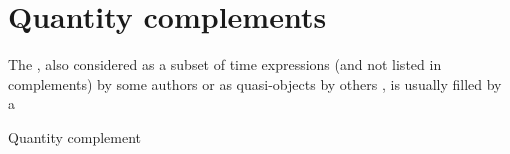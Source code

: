 \documentclass[../main.tex]{subfiles}
\begin{document}
\section{Quantity complements}\label{sec:quantity-complement}

The , also considered as a subset of time expressions (and not listed in complements)
by some authors \citep[Sections 7.2-7.4]{po2015chinese} or as quasi-objects by others \citep[]{xianhan2004}, is usually filled by a %

Quantity complement 


\cite{huang2008}
\end{document}

